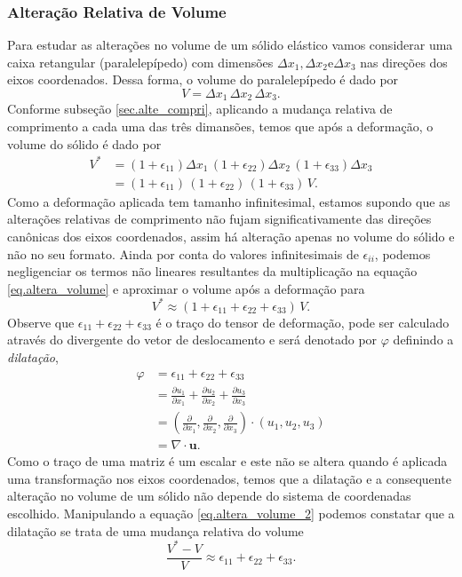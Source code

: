 \subsubsection{Altera\c{c}\~ao Relativa de Volume}

Para estudar as altera\c{c}\~oes no volume de um s\'olido el\'astico vamos considerar uma caixa retangular (paralelep\'ipedo) com dimens\~oes $\Delta x_1, \Delta x_2 \text{e} \Delta x_3$ nas dire\c{c}\~oes dos eixos coordenados.  Dessa forma, o volume do paralelep\'ipedo \'e dado por\begin{equation*}
V=\Delta x_1\,\Delta x_2\,\Delta x_3.
\end{equation*}
Conforme subse\c{c}\~ao \ref{sec.alte_compri}, aplicando a mudan\c{c}a relativa de comprimento a cada uma das tr\^es dimans\~oes, temos que ap\'os a deforma\c{c}\~ao, o volume do s\'olido \'e dado por
\begin{align}\nonumber
V^*&=(1+\epsilon_{11})\Delta x_1\,(1+\epsilon_{22})\Delta x_2\,(1+\epsilon_{33})\Delta x_3\\\label{eq.altera_volume}
&=(1+\epsilon_{11})\,(1+\epsilon_{22})\,(1+\epsilon_{33})\,V.
\end{align}
Como a deforma\c{c}\~ao aplicada tem tamanho infinitesimal, estamos supondo que as altera\c{c}\~oes relativas de comprimento n\~ao fujam significativamente das dire\c{c}\~oes can\^onicas dos eixos coordenados, assim h\'a altera\c{c}\~ao apenas no volume do s\'olido e n\~ao no seu formato. Ainda por conta do valores infinitesimais de $\epsilon_{ii}$, podemos negligenciar os termos n\~ao lineares resultantes da multiplica\c{c}\~ao na equa\c{c}\~ao \ref{eq.altera_volume} e aproximar o volume ap\'os a deforma\c{c}\~ao para
\begin{equation}\label{eq.altera_volume_2}
V^*\approx(1+\epsilon_{11}+\epsilon_{22}+\epsilon_{33})\,V.
\end{equation}
Observe que $\epsilon_{11}+\epsilon_{22}+\epsilon_{33}$ \'e o tra\c{c}o do tensor de deforma\c{c}\~ao, pode ser calculado atrav\'es do divergente do vetor de deslocamento e ser\'a denotado por $\varphi$ definindo a \textit{dilata\c{c}\~ao},
\begin{align*}
\varphi &=\epsilon_{11}+\epsilon_{22}+\epsilon_{33}\\
&=\frac{\partial u_1}{\partial x_1}+\frac{\partial u_2}{\partial x_2}+\frac{\partial u_3}{\partial x_3}\\
&=\left(\frac{\partial}{\partial x_1},\frac{\partial}{\partial x_2},\frac{\partial}{\partial x_3}\right)\cdot(u_1,u_2,u_3)\\
&=\nabla\cdot \mathbf{u}.
\end{align*}
Como o tra\c{c}o de uma matriz \'e um escalar e este n\~ao se altera quando \'e aplicada uma transforma\c{c}\~ao nos eixos coordenados, temos que a dilata\c{c}\~ao e a consequente altera\c{c}\~ao no volume de um s\'olido n\~ao depende do sistema de coordenadas escolhido. Manipulando a equa\c{c}\~ao \ref{eq.altera_volume_2} podemos constatar que a dilata\c{c}\~ao se trata de uma mudan\c{c}a relativa do volume
\begin{equation*}
\frac{V^*-V}{V}\approx\epsilon_{11}+\epsilon_{22}+\epsilon_{33}.
\end{equation*}

